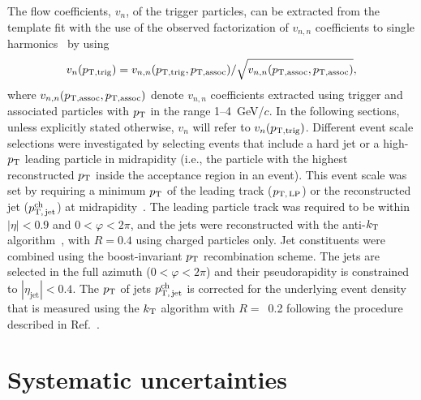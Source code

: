 The flow coefficients, $v_{n}$, of the trigger particles, can be extracted from the template fit with the use of the observed factorization of $v_{n,n}$ coefficients to single harmonics~\cite{ATLAS:2015hzw,ATLAS:2016yzd} by using
\begin{eqnarray}
v_{n}(p_{\rm{T,trig}}) = v_{n,n}(p_{\rm{T,trig}}, p_{\rm{T,assoc}}) / \sqrt{ v_{n,n}(p_{\rm{T,assoc}},p_{\rm{T,assoc}})},
\end{eqnarray}
where $v_{n,n}(p_{\rm{T,assoc}}, p_{\rm{T,assoc}})$ denote $v_{n,n}$ coefficients extracted using trigger and associated particles with $p_{\rm{T}}$ in the range 1--4~GeV/$c$. In the following sections, unless explicitly stated otherwise, $v_n$ will refer to $v_n(p_{\rm{T,trig}})$.
Different event scale selections were investigated by selecting events that include a hard jet or a high-$p_\mathrm{T}$ leading particle in midrapidity (i.e., the particle with the highest reconstructed $p_\mathrm{T}$ inside the acceptance region in an event).
This event scale was set by requiring a minimum $p_\mathrm{T}$ of the leading track ($p_\mathrm{T,\,LP}$) or the reconstructed jet ($p_\mathrm{T,\,jet}^\mathrm{ch}$) at midrapidity~\cite{ALICE:2021nir}. The leading particle track was required to be within $|\eta|<0.9$ and $0<\varphi<2\pi$, and the jets were reconstructed with the anti-$k_{\rm{T}}$ algorithm~\cite{Cacciari:2008gp,Cacciari:2011ma}, with $R=0.4$ using charged particles only. Jet constituents were combined using the boost-invariant $p_\mathrm{T}$ recombination scheme. The jets are selected in the full azimuth ($0<\varphi<2\pi$) and their pseudorapidity is constrained to $|\eta_\mathrm{jet}|<0.4$. The $p_\mathrm{T}$ of jets $p_\mathrm{T,\,jet}^\mathrm{ch}$ is corrected for the underlying event density that is measured using the $k_{\rm{T}}$ algorithm with $R=$~0.2 following the procedure described in Ref.~\cite{Acharya:2018eat}.


\section{Systematic uncertainties}
\label{sec:uncertainties}

